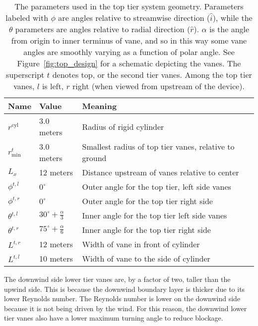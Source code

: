 \begin{table}[!htb]
\centering
 \caption{The parameters used in the top tier system
 geometry. Parameters labeled with $\phi$ are angles relative to
 streamwise direction ($\hat i$), while the $\theta$ parameters are
 angles relative to radial direction ($\hat r$). $\alpha$ is the angle
 from origin to inner terminus of vane, and so in this way some vane
 angles are smoothly varying as a function of polar angle. See
 Figure~\ref{fig:top_design} for a schematic depicting the vanes. The
 superscript $t$ denotes top, or the second tier vanes. Among the top
 tier vanes, $l$ is left, $r$ right (when viewed from upstream of the
 device).}
\begin{tabular}{l|l|l}
Name                        & Value & Meaning                    \\
 \hline
$r^{\text{cyl}}$            &  3.0 meters & Radius of rigid cylinder \\
$r^t_{\text{min}}$          &  3.0 meters & Smallest radius of top tier
	 vanes, relative to ground \\
$L_x$                       &  12 meters  & Distance upstream
	 of vanes relative to center\\
$\phi^{t,l}$ &  $0^{\circ}$   & Outer angle for the top tier, left side vanes \\
$\phi^{t,r}$   &  $0^{\circ}$   & Outer angle for the top tier right side \\
$\theta^{t,l}$ &   $30^{\circ} +\frac{\alpha}{3}$  & Inner angle for the top tier left side vanes\\
$\theta^{t,r}$   &   $75^{\circ} +\frac{\alpha}{6}$   & Inner angle for the top tier right side \\
$L^{t,r}$                   &  12 meters  & Width of vane in front of cylinder \\
$L^{t,l}$                   &  10 meters  & Width of vane to the side of cylinder \\
\end{tabular}
 \label{tab:top}
\end{table}



The downwind side lower tier vanes are, by a factor of two, taller 
than the upwind side. This
is because the downwind boundary layer is thicker due to its 
lower Reynolds number. The Reynolds number is lower on the
downwind side because it is not being driven by the wind.
For this reason, the downwind lower tier
vanes also have a lower maximum turning angle to reduce blockage.

